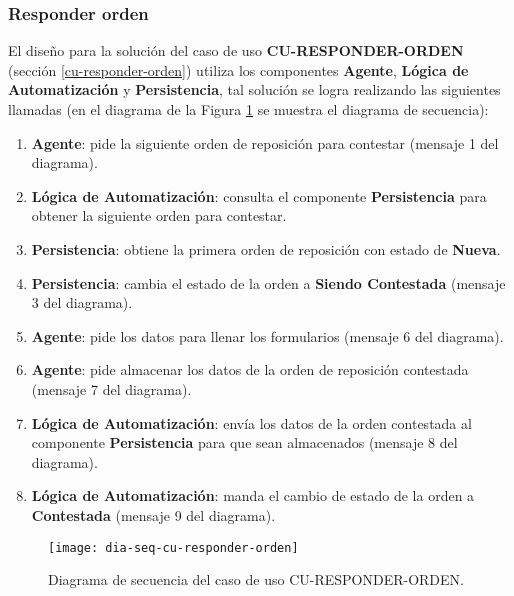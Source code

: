 \subsubsection{Responder orden}
El diseño para la solución del caso de uso \textbf{CU-RESPONDER-ORDEN} (sección \ref{cu-responder-orden}) utiliza los componentes \textbf{Agente}, \textbf{Lógica de Automatización} y \textbf{Persistencia}, tal solución se logra realizando las siguientes llamadas (en el diagrama de la Figura \ref{fig:dia-seq-cu-responder-orden} se muestra el diagrama de secuencia):
\begin{enumerate}
	\item \textbf{Agente}: pide la siguiente orden de reposición para contestar (mensaje 1 del diagrama).
	\item \textbf{Lógica de Automatización}: consulta el componente \textbf{Persistencia} para obtener la siguiente orden para contestar.
	\item \textbf{Persistencia}: obtiene la primera orden de reposición con estado de \textbf{Nueva}.
	\item \textbf{Persistencia}: cambia el estado de la orden a \textbf{Siendo Contestada} (mensaje 3 del diagrama).
	\item \textbf{Agente}: pide los datos para llenar los formularios (mensaje 6 del diagrama).
	\item \textbf{Agente}: pide almacenar los datos de la orden de reposición contestada (mensaje 7 del diagrama).
	\item \textbf{Lógica de Automatización}: envía los datos de la orden contestada al componente \textbf{Persistencia} para que sean almacenados (mensaje 8 del diagrama).
	\item \textbf{Lógica de Automatización}: manda el cambio de estado de la orden a \textbf{Contestada} (mensaje 9 del diagrama).
\end{enumerate}

\begin{figure}[h]
	\centering
	\texttt{[image: dia-seq-cu-responder-orden]}
	\caption{Diagrama de secuencia del caso de uso CU-RESPONDER-ORDEN.}
	\label{fig:dia-seq-cu-responder-orden}
\end{figure}

